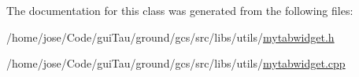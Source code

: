 The documentation for this class was generated from the following files\-:\begin{DoxyCompactItemize}
\item 
/home/jose/\-Code/gui\-Tau/ground/gcs/src/libs/utils/\hyperlink{mytabwidget_8h}{mytabwidget.\-h}\item 
/home/jose/\-Code/gui\-Tau/ground/gcs/src/libs/utils/\hyperlink{mytabwidget_8cpp}{mytabwidget.\-cpp}\end{DoxyCompactItemize}

